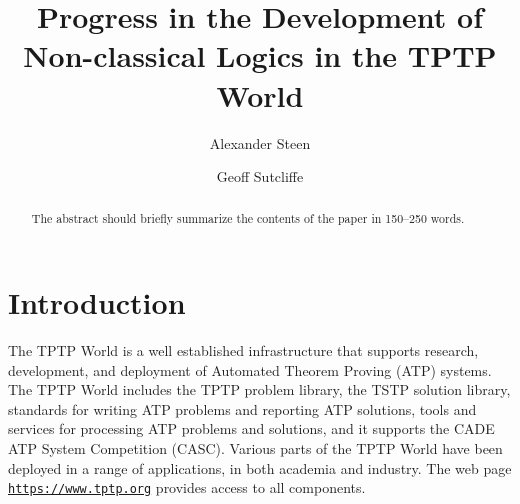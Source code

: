 \documentclass[runningheads]{llncs}
\begin{document}
\title{Progress in the Development of\\ Non-classical Logics in the TPTP World}

\author{Alexander Steen 
\and
Geoff Sutcliffe}

\maketitle
\begin{abstract}
The abstract should briefly summarize the contents of the paper in
150--250 words.

\end{abstract}
\section{Introduction}
\label{Introduction}

The TPTP World \cite{Sut17} is a well established infrastructure that supports research, 
development, and deployment of Automated Theorem Proving (ATP) systems.
The TPTP World includes the TPTP problem library,
the TSTP solution library,
standards for writing ATP problems and reporting ATP solutions,
tools and services for processing ATP problems and solutions,
and it supports the CADE ATP System Competition (CASC).
Various parts of the TPTP World have been deployed in a range of applications,
in both academia and industry.
The web page \href{https://www.tptp.org}{\tt https://www.tptp.org} provides access to all 
components.
\end{document}
